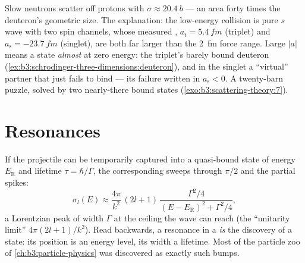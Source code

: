 \begin{example}\label{ex:b3:scattering-theory:np}
Slow neutrons scatter off protons with $\sigma \approx
\qty{20.4}{b}$ --- an area forty times the deuteron's geometric
size. The explanation: the low-energy collision is pure $s$ wave
with two spin channels, whose measured ,
$a_{\text{t}} = \qty{5.4}{fm}$ (triplet) and $a_{\text{s}} =
\qty{-23.7}{fm}$ (singlet), are both far larger than the
\qty{2}{fm} force range. Large $|a|$ means a state \emph{almost}
at zero energy: the triplet's barely bound deuteron
(\cref{ex:b3:schrodinger-three-dimensions:deuteron}), and in the
singlet a ``virtual'' partner that just fails to bind --- its
failure written in $a_{\text{s}} < 0$. A twenty-barn puzzle,
solved by two nearly-there bound states
(\cref{exo:b3:scattering-theory:7}).
\end{example}

\section{Resonances}

\begin{proposition}\label{prop:b3:scattering-theory:resonance}
If the projectile can be temporarily captured into a quasi-bound
state of energy $E_{\text{R}}$ and lifetime $\tau = \hbar/\Gamma$,
the corresponding  sweeps through $\pi/2$ and the
partial  spikes:
\[
\sigma_l(E) \approx \frac{4\pi}{k^2}\,(2l+1)\,
\frac{\Gamma^2/4}{(E - E_{\text{R}})^2 + \Gamma^2/4} ,
\]
a Lorentzian peak of width $\Gamma$ at the ceiling the wave can
reach (the ``unitarity limit'' $4\pi(2l+1)/k^2$). Read backwards, a
resonance in a  \emph{is} the discovery of a state:
its position is an energy level, its width a lifetime. Most of the
particle zoo of \cref{ch:b3:particle-physics} was discovered as
exactly such bumps.
\end{proposition}
\admitted

